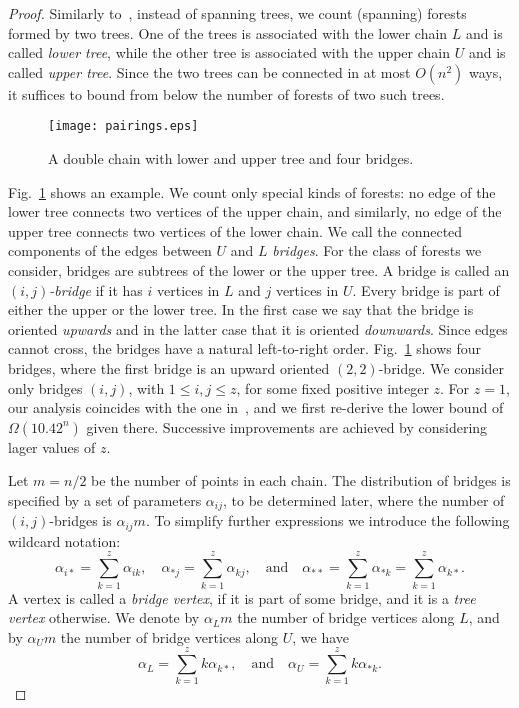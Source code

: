 \documentclass[11pt]{article}
\begin{document}
\begin{proof}
Similarly to~\cite{D02}, instead of spanning trees, we count
(spanning) forests formed by two trees. One of the trees is
associated with the lower chain $L$ and is called \emph{lower tree},
while the other tree is associated with the upper chain $U$ and is
called \emph{upper tree}. Since the two trees can be connected in at
most $O(n^2)$ ways, it suffices to bound from below the number of forests of two
such trees.
\begin{figure}[htbp]
\centerline{\texttt{[image: pairings.eps]}}
\caption{A double chain with lower and upper tree and four bridges.}
\label{fig:pairings}
\end{figure}

Fig.~\ref{fig:pairings} shows an example. We count only special kinds of forests:
no edge of the lower tree connects two vertices of the upper chain, and similarly,
no edge of the upper tree connects two vertices of the lower chain.
We call the connected components of the edges between $U$ and $L$
\emph{bridges}. For the class of forests we consider, bridges are
subtrees of the lower or the upper tree. A bridge is called an \emph{$(i,j)$-bridge}
if it has $i$ vertices in $L$ and $j$ vertices in $U$.
Every bridge is part of either the upper or the lower tree.
In the first case we say that the bridge is oriented {\em upwards} and in the latter
case that it is oriented {\em downwards}. Since edges cannot cross, the bridges have
a natural left-to-right order. Fig.~\ref{fig:pairings} shows four
bridges, where the first bridge is an upward oriented
$(2,2)$-bridge. We consider only bridges
$(i,j)$, with $1\leq i,j \leq z$, for some fixed positive integer $z$.
For $z=1$, our analysis coincides with the one in~\cite{D02}, and we first
re-derive the lower bound of $\Omega(10.42^n)$ given there.
Successive improvements are achieved by considering lager values of $z$.

Let $m=n/2$ be the number of points in each chain. The distribution of
bridges is specified by a set of parameters $\alpha_{ij}$, to be determined later,
where the number of $(i,j)$-bridges is $\alpha_{ij} m$. To simplify
further expressions we introduce the following wildcard notation:
\[ \alpha_{i*}=\sum_{k=1}^z \alpha_{ik}, \quad \alpha_{*j}=\sum_{k=1}^z
\alpha_{kj},\quad \text{and} \quad
\alpha_{**}=\sum_{k=1}^z \alpha_{*k}=\sum_{k=1}^z \alpha_{k*}.\]
A vertex is called a \emph{bridge vertex}, if it is part of
some bridge, and it is a \emph{tree vertex} otherwise.
We denote by $\alpha_L m$ the number of bridge vertices along $L$,
and by $\alpha_U m$
the number of bridge vertices along $U$, we have
\[ \alpha_L= \sum_{k=1}^z k\alpha_{k*}, \quad \text{and} \quad \alpha_U =
\sum_{k=1}^z k\alpha_{*k}.\]


\end{proof}
\end{document}
